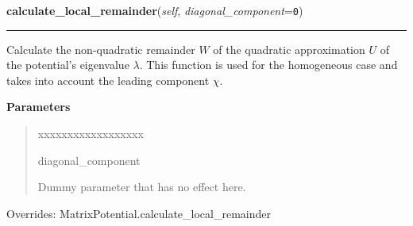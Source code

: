 \hspace{.8\funcindent}\begin{boxedminipage}{\funcwidth}

    \raggedright \textbf{calculate\_local\_remainder}(\textit{self}, \textit{diagonal\_component}={\tt 0})

    \vspace{-1.5ex}

    \rule{\textwidth}{0.5\fboxrule}
\setlength{\parskip}{2ex}
    Calculate the non-quadratic remainder $W$ of the quadratic
    approximation $U$ of the potential's eigenvalue
    $\lambda$. This function is used for the homogeneous
    case and takes into account the leading component
    $\chi$.

\setlength{\parskip}{1ex}
      \textbf{Parameters}
      \vspace{-1ex}

      \begin{quote}
        \begin{Ventry}{xxxxxxxxxxxxxxxxxx}

          \item[diagonal\_component]

          Dummy parameter that has no effect here.

        \end{Ventry}

      \end{quote}

      Overrides: MatrixPotential.calculate\_local\_remainder

    \end{boxedminipage}

    \vspace{0.5ex}


